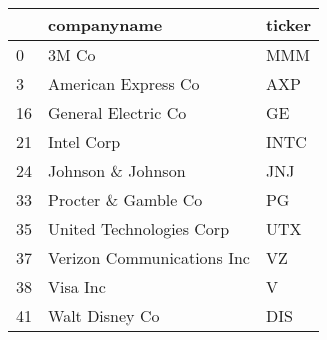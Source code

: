 \begin{tabular}{lll}
\toprule
{} &                 companyname & ticker \\
\midrule
0  &                       3M Co &    MMM \\
3  &         American Express Co &    AXP \\
16 &         General Electric Co &     GE \\
21 &                  Intel Corp &   INTC \\
24 &           Johnson \& Johnson &    JNJ \\
33 &         Procter \& Gamble Co &     PG \\
35 &    United Technologies Corp &    UTX \\
37 &  Verizon Communications Inc &     VZ \\
38 &                    Visa Inc &      V \\
41 &              Walt Disney Co &    DIS \\
\bottomrule
\end{tabular}
